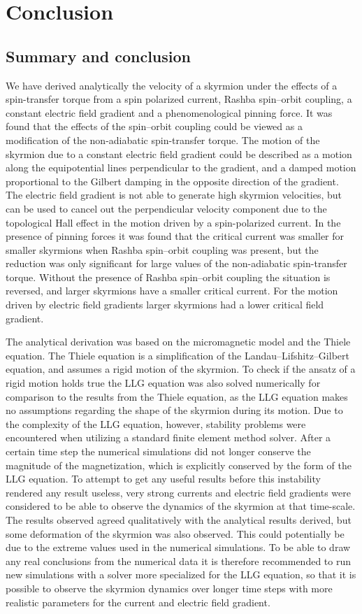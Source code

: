 \chapter{Conclusion}
\section{Summary and conclusion}
We have derived analytically the velocity of a skyrmion under the effects of a spin-transfer torque from a spin polarized current, Rashba spin--orbit coupling, a constant electric field gradient and a phenomenological pinning force. It was found that the effects of the spin--orbit coupling could be viewed as a modification of the non-adiabatic spin-transfer torque. The motion of the skyrmion due to a constant electric field gradient could be described as a motion along the equipotential lines perpendicular to the gradient, and a damped motion proportional to the Gilbert damping in the opposite direction of the gradient. The electric field gradient is not able to generate high skyrmion velocities, but can be used to cancel out the perpendicular velocity component due to the topological Hall effect in the motion driven by a spin-polarized current. In the presence of pinning forces it was found that the critical current was smaller for smaller skyrmions when Rashba spin--orbit coupling was present, but the reduction was only significant for large values of the non-adiabatic spin-transfer torque. Without the presence of Rashba spin--orbit coupling the situation is reversed, and larger skyrmions have a smaller critical current. For the motion driven by electric field gradients larger skyrmions had a lower critical field gradient.

The analytical derivation was based on the micromagnetic model and the Thiele equation. The Thiele equation is a simplification of the Landau--Lifshitz--Gilbert equation, and assumes a rigid motion of the skyrmion. To check if the ansatz of a rigid motion holds true the LLG equation was also solved numerically for comparison to the results from the Thiele equation, as the LLG equation makes no assumptions regarding the shape of the skyrmion during its motion. Due to the complexity of the LLG equation, however, stability problems were encountered when utilizing a standard finite element method solver. After a certain time step the numerical simulations did not longer conserve the magnitude of the magnetization, which is explicitly conserved by the form of the LLG equation. To attempt to get any useful results before this instability rendered any result useless, very strong currents and electric field gradients were considered to be able to observe the dynamics of the skyrmion at that time-scale. The results observed agreed qualitatively with the analytical results derived, but some deformation of the skyrmion was also observed. This could potentially be due to the extreme values used in the numerical simulations. To be able to draw any real conclusions from the numerical data it is therefore recommended to run new simulations with a solver more specialized for the LLG equation, so that it is possible to observe the skyrmion dynamics over longer time steps with more realistic parameters for the current and electric field gradient.

